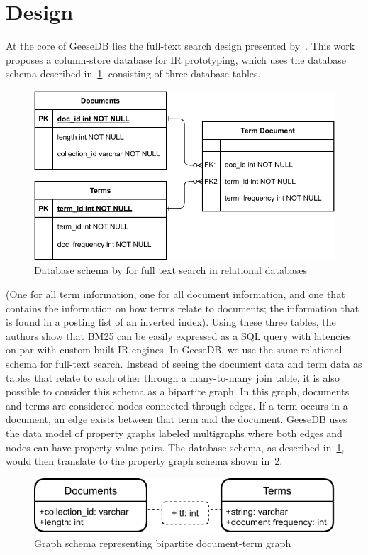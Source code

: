 \section{Design}
At the core of GeeseDB lies the full-text search design presented by~\citet{OldDog}. This work proposes a column-store database for IR prototyping, which uses the database schema described in~\cref{olddog_schema}, consisting of three database tables.
\begin{figure}
	\centering
	\includegraphics[width=\linewidth]{./imgs/olddog-schema-2.pdf}
	\caption{Database schema by \citeauthor{OldDog} for full text search in relational databases}
	\label{olddog_schema}
\end{figure}
(One for all term information, one for all document information, and one that contains the information on how terms relate to documents; the information that is found in a posting list of an inverted index). Using these three tables, the authors show that BM25 can be easily expressed as a SQL query with latencies on par with custom-built IR engines. In GeeseDB, we use the same relational schema for full-text search.
Instead of seeing the document data and term data as tables that relate to each other through a many-to-many join table, it is also possible to consider this schema as a bipartite graph. In this graph, documents and terms are considered nodes connected through edges. If a term occurs in a document, an edge exists between that term and the document. GeeseDB uses the data model of property graphs labeled multigraphs where both edges and nodes can have property-value pairs. The database schema, as described in~\cref{olddog_schema}, would then translate to the property graph schema shown in~\cref{olddog-graph-schema}.
\begin{figure}
	\centering
	\includegraphics[width=\linewidth]{./imgs/olddog-graph-schema.pdf}
	\caption{Graph schema representing bipartite document-term graph}
	\label{olddog-graph-schema}
\end{figure}
